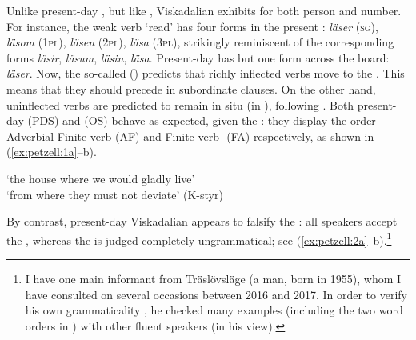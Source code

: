 \documentclass[output=paper,colorlinks,citecolor=brown,draft,draftmode]{langscibook}
\begin{document}
Unlike present-day , but like , Viskadalian exhibits  for both person and number. For instance, the weak verb ‘read’ has four forms in the present : \textit{läser} (\textsc{sg}), \textit{läsom} (1\textsc{pl}), \textit{läsen} (2\textsc{pl}), \textit{läsa} (3\textsc{pl}), strikingly reminiscent of the corresponding  forms \textit{läsir}, \textit{läsum}, \textit{läsin}, \textit{läsa}. Present-day  has but one form across the board: \textit{läser}. Now, the so-called  () predicts that richly inflected verbs move to the . This means that they should precede  in subordinate clauses. On the other hand, uninflected verbs are predicted to remain {in situ} (in ), following . Both present-day  (PDS) and  (OS) behave as expected, given the : they display the order Adverbial-Finite verb (AF) and Finite verb- (FA) respectively, as shown in (\ref{ex:petzell:1a}–b).


\ea\label{ex:petzell:1}
\glt `the house where we would gladly live’  \\
\glt `from where they must not deviate’ (K-styr)
\z
\z


By contrast, present-day Viskadalian appears to falsify the : all speakers accept the , whereas the  is judged completely ungrammatical; see (\ref{ex:petzell:2a}–b).\footnote{I have one main informant from Träslövsläge (a man, born in 1955), whom I have consulted on several occasions between 2016 and 2017. In order to verify his own grammaticality , he checked many examples (including the two word orders in ) with other fluent  speakers (in his view).}
\end{document}
